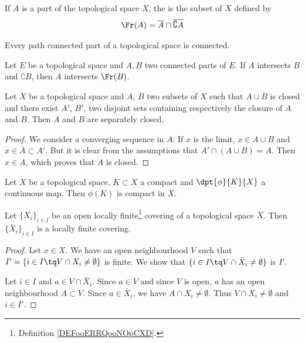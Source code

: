 If $A$ is a part of the topological space $X$, the  is the subset of $X$ defined by
\[
	\Fr(A)=\overline{A}\cap\overline{\complement A}
\]

\begin{lemma}
	Every path connected part of a topological space is connected.
\end{lemma}

\begin{theorem}
	Let $E$ be a topological space and $A,B$ two connected parts of $E$. If $A$ intersects $B$ and $\complement B$, then $A$ intersects $\Fr(B)$.\label{tho:doine}
\end{theorem}


\begin{proposition}
	Let $X$ be a topological space and $A$, $B$ two subsets of $X$ such that $A\cup B$ is closed and there exist $A'$, $B'$, two disjoint sets containing respectively the closure of $A$ and $B$. Then $A$ and $B$ are separately closed.\label{prop:sep_ferme}
\end{proposition}

\begin{proof}
	We consider a converging sequence in $A$. If $x$ is the limit, $x\in A\cup B$ and $x\in\overline{A}\subset A'$. But it is clear from the assumptions that $A'\cap(A\cup B)=A$. Then $x\in A$, which proves that $A$ is closed.
\end{proof}

\begin{proposition}
	Let $X$ be a topological space, $K\subset X$ a compact and $\dpt{\phi}{K}{X}$ a continuous map. Then $\phi(K)$ is compact in $X$.
\end{proposition}


\begin{lemma}		\label{LEMooGRPUooVhmqDH}
	Let \( \{ X_i \}_{i\in I}\) be an open locally finite\footnote{Definition \ref{DEFooERRQooNOpCXD}.} covering of a topological space \( X\). Then \( \{ \bar X_i \}_{i\in I}\) is a locally finite covering.
\end{lemma}

\begin{proof}
	Let \( x\in X\). We have an open neighbourhood \( V\) such that \( I'=\{ i\in I\tq V\cap X_i\neq\emptyset \}\) is finite. We show that \( \{ i\in I\tq V\cap \bar X_i\neq \emptyset \}\) is \( I'\).

	Let \( i\in I\) and \(a\in V\cap \bar X_i\). Since \( a\in V\) and since  \( V\) is open, \( a\) has an open neighbourhood \( A\subset V\). Since \( a\in\bar X_i\), we have \( A\cap X_i\neq \emptyset\). Thus \( V\cap X_i\neq \emptyset\) and \(  i\in I'\).
\end{proof}



